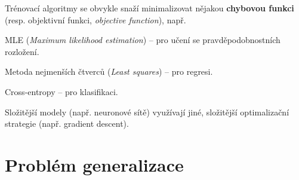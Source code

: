 \begin{compactitem}
    \item Trénovací algoritmy se obvykle snaží minimalizovat nějakou \textbf{chybovou funkci} (resp. objektivní funkci, \textit{objective function}), např. \begin{compactitem}
        \item MLE (\textit{Maximum likelihood estimation}) -- pro učení se pravděpodobnostních rozložení.

        \item Metoda nejmenších čtverců (\textit{Least squares}) -- pro regresi.

        \item Cross-entropy -- pro klasifikaci.
    \end{compactitem}

    \item Složitější modely (např. neuronové sítě) využívají jiné, složitější optimalizační strategie (např. gradient descent).
\end{compactitem}


\section{Problém generalizace}

